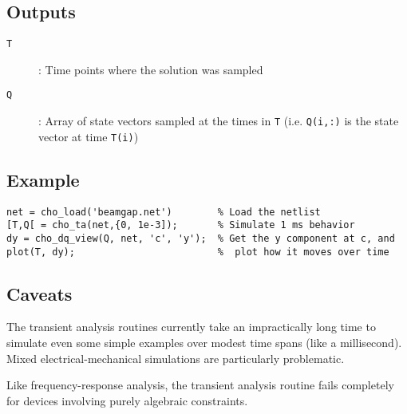 \subsection*{Outputs}

\begin{description}
\item[\texttt{T}]: Time points where the solution was sampled
\item[\texttt{Q}]: Array of state vectors sampled at the times in 
  \texttt{T}
  (i.e. \texttt{Q(i,:)} is the state vector at time \texttt{T(i)})
\end{description}

\subsection*{Example}

\begin{verbatim}
net = cho_load('beamgap.net')        % Load the netlist
[T,Q[ = cho_ta(net,{0, 1e-3]);       % Simulate 1 ms behavior
dy = cho_dq_view(Q, net, 'c', 'y');  % Get the y component at c, and
plot(T, dy);                         %  plot how it moves over time
\end{verbatim}

\subsection*{Caveats}

The transient analysis routines currently take an impractically long
time to simulate even some simple examples over modest time spans
(like a millisecond).  Mixed electrical-mechanical simulations
are particularly problematic.

Like frequency-response analysis, the transient analysis routine fails
completely for devices involving purely algebraic constraints.

